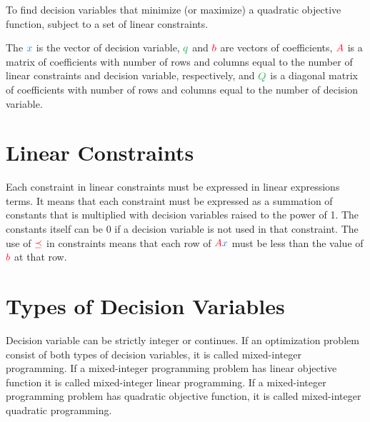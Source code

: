 \documentclass{article}
\begin{document}
To find \textcolor{var}{decision variables} that \textcolor{opt}{minimize} (or \textcolor{opt}{maximize}) a \textcolor{obj}{quadratic objective function}, subject to a set of \textcolor{const}{linear constraints}.

The $\color{var} x$ is the vector of \textcolor{var}{decision variable}, $\color{obj} q$ and $\color{const} b$ are vectors of coefficients, $\color{const} A$ is a matrix of coefficients with number of rows and columns equal to the number of \textcolor{const}{linear constraints} and \textcolor{var}{decision variable}, respectively, and $\color{obj} Q$ is a diagonal matrix of coefficients with number of rows and columns equal to the number of \textcolor{var}{decision variable}.

\section{Linear Constraints}

Each \textcolor{const}{constraint} in \textcolor{const}{linear constraints} must be expressed in linear expressions terms. It means that each \textcolor{const}{constraint} must be expressed as a summation of \textcolor{const}{constants} that is multiplied with \textcolor{var}{decision variables} raised to the power of 1. The \textcolor{const}{constants} itself can be $0$ if a \textcolor{var}{decision variable} is not used in that \textcolor{const}{constraint}. The use of $\color{const} \preceq$ in \textcolor{const}{constraints} means that each row of $\color{const} A \color{var} x$ must be less than the value of $\color{const} b$ at that row.

\section{Types of Decision Variables}

\textcolor{var}{Decision variable} can be strictly integer or continues. If an optimization problem consist of both types of \textcolor{var}{decision variables}, it is called \textcolor{var}{mixed-integer} programming. If a \textcolor{var}{mixed-integer} programming problem has \textcolor{obj}{linear objective function} it is called \textcolor{var}{mixed-integer} \textcolor{obj}{linear} programming. If a \textcolor{var}{mixed-integer} programming problem has \textcolor{obj}{quadratic objective function}, it is called \textcolor{var}{mixed-integer} \textcolor{obj}{quadratic} programming.
\end{document}

